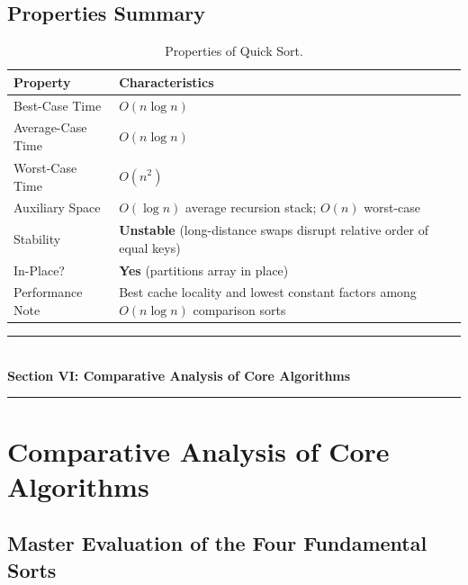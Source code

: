 \subsection{Properties Summary}

\begin{table}[htbp]
\centering
\small
\begin{tabularx}{\textwidth}{l X}
\toprule
\textbf{Property} & \textbf{Characteristics} \\
\midrule
Best-Case Time    & $O(n \log n)$ \\
Average-Case Time & $O(n \log n)$ \\
Worst-Case Time   & $\boxed{O(n^2)}$ \\
Auxiliary Space   & $O(\log n)$ average recursion stack; $O(n)$ worst-case \\
Stability         & \textbf{Unstable} (long-distance swaps disrupt relative order of equal keys) \\
In-Place?         & \textbf{Yes} (partitions array in place) \\
Performance Note  & Best cache locality and lowest constant factors among $O(n \log n)$ comparison sorts \\
\bottomrule
\end{tabularx}
\caption{Properties of Quick Sort.}
\end{table}

\newpage
\begin{center}
\vspace{0.5em}
{\color{primary}\rule{0.45\textwidth}{1.2pt}}\\[4pt]
{\Large\bfseries\color{primary} Section VI: Comparative Analysis of Core Algorithms}\\[2pt]
{\color{primary}\rule{0.45\textwidth}{1.2pt}}
\vspace{0.5em}
\end{center}

\section{Comparative Analysis of Core Algorithms}

\subsection{Master Evaluation of the Four Fundamental Sorts}

